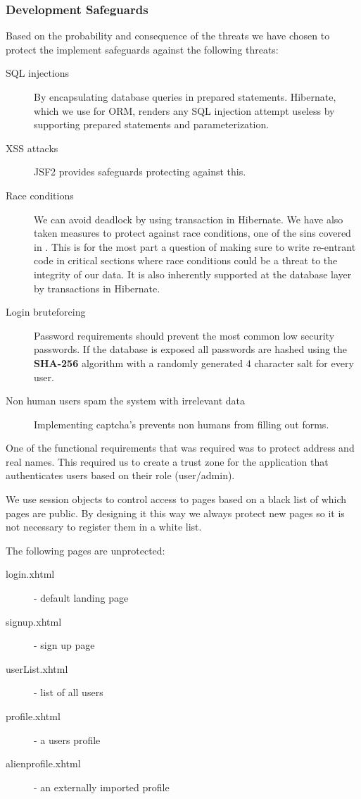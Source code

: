 \documentclass[a4paper]{article}
\begin{document}
\subsubsection{Development Safeguards}
Based on the probability and consequence of the threats we have chosen to protect the implement safeguards against the following threats:
\begin{description}
\item[SQL injections] By encapsulating database queries in prepared statements. Hibernate, which we use for ORM, renders any SQL injection attempt useless by supporting prepared statements and parameterization.
\item[XSS attacks] JSF2 provides safeguards protecting against this.
\item[Race conditions] We can avoid deadlock by using transaction in Hibernate. 
We have also taken measures to protect against race conditions, one of the sins covered in \cite{sins2009}. This is for the most part a question of making sure to write re-entrant code in critical sections where race conditions could be a threat to the integrity of our data. It is also inherently supported at the database layer by transactions in Hibernate.
\item[Login bruteforcing] Password requirements should prevent the most common low security passwords. If the database is exposed all passwords are hashed using the
\textbf{SHA-256} algorithm with a randomly generated 4 character salt for every user.
\item[Non human users spam the system with irrelevant data] Implementing captcha's prevents non humans from filling out forms.
\end{description}


One of the functional requirements that was required was to protect address and real names. This required us to create a trust zone for the application that authenticates users based on their role (user/admin). 

We use session objects to control access to pages based on a black list of which pages are public. By designing it this way we always protect new pages so it is not necessary to register them in a white list. 

The following pages are unprotected:
\begin{description}
\item[login.xhtml] - default landing page
\item[signup.xhtml] - sign up page
\item[userList.xhtml] - list of all users
\item[profile.xhtml] - a users profile
\item[alienprofile.xhtml] - an externally imported profile
\end{description}
\end{document}
